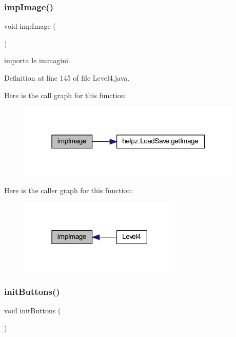\subsubsection{\texorpdfstring{imp\+Image()}{impImage()}}
{\footnotesize\ttfamily void imp\+Image (\begin{DoxyParamCaption}{ }\end{DoxyParamCaption})\hspace{0.3cm}{\ttfamily [private]}}



importa le immagini. 



Definition at line 145 of file Level4.\+java.

Here is the call graph for this function\+:
\nopagebreak
\begin{figure}[H]
\begin{center}
\leavevmode
\includegraphics[width=303pt]{classscenes_1_1_level4_aded9c531b53772fd90d09a8b6bf0132e_cgraph}
\end{center}
\end{figure}
Here is the caller graph for this function\+:\nopagebreak
\begin{figure}[H]
\begin{center}
\leavevmode
\includegraphics[width=219pt]{classscenes_1_1_level4_aded9c531b53772fd90d09a8b6bf0132e_icgraph}
\end{center}
\end{figure}
\mbox{\label{classscenes_1_1_level4_a27d3ba5afb772cc36c9a432c28975ace}} 
\subsubsection{\texorpdfstring{init\+Buttons()}{initButtons()}}
{\footnotesize\ttfamily void init\+Buttons (\begin{DoxyParamCaption}{ }\end{DoxyParamCaption})\hspace{0.3cm}{\ttfamily [private]}}



